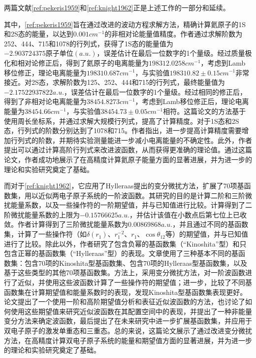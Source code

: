 两篇文献\cref{ref:pekeris1959}和\cref{ref:knight1962}正是上述工作的一部分和延续。

其中，\cref{ref:pekeris1959}旨在通过改进的波动方程求解方法，精确计算氦原子的1S和2S态的能量，以达到$0.001 cm^{-1}$的非相对论能量值精度。作者通过求解阶数为252、444、715和1078的行列式，获得了1S态的能量值为$-2.903724375\text{原子单位}(a.u.)$，误差估计在最后一位数字的1个量级。经过质量极化和相对论修正后，得到了氦原子的电离能量为$198312.0258 cm^{-1}$，考虑到Lamb移位修正，理论电离能量为$198310.687 cm^{-1}$，与实验值$198310.82\pm0.15 cm^{-1}$非常接近。对2S态，求解阶数为125、252、444和715的行列式，最终能量值为$-2.17522937822 a.u.$，误差估计在最后一位数字的1个量级。经过相同的修正后，得到了非相对论电离能量为$38454.8273 cm^{-1}$，考虑到Lamb移位修正后，理论电离能量为$38454.66 cm^{-1}$，与实验值$38454.73\pm0.05 cm^{-1}$相符。这篇论文的方法基于使用周长坐标系，并通过求解大规模行列式，提高了计算精度。对于1S态和2S态，行列式的阶数分别达到了1078和715。作者指出，进一步提高计算精度需要增加行列式的阶数，并期待实验测量能进一步减小电离能量的不确定性。此外，作者提出可以通过计算高阶行列式来改进波函数，从而获得更准确的理论值。通过这篇论文，作者成功地展示了在高精度计算氦原子能量方面的显著进展，并为进一步的理论和实验研究奠定了基础。

而对于\cref{ref:knight1962}，它应用了Hylleraas提出的变分微扰方法，扩展了70项基函数集，用以近似两电子原子系统的一阶波函数。其研究的目的是计算二阶和三阶微扰能量系数，以及一些操作符的一阶期望值，并与已知值进行比较。计算得到了二阶微扰能量系数的上限为$-0.15766625 a.u.$，并估计该值在小数点后第七位上已收敛。作者计算得到了三阶微扰能量系数为$0.00869868 a.u.$，并且通过不同的基函数集，计算了一些操作符（如\(\delta(r_1)\)、\(r_1^{-2}\)、\(r_1\)、\(\cos\theta_{12}\)等）的期望值，并与已知值进行了比较。除此以外，作者研究了包含负幂的基函数集（“Kinoshita”型）和只包含正幂的基函数集（“Hylleraas”型）的表现。文章使用了三种基本不同的基函数集：包含70项的Kinoshita型基函数集、包含70项的Hylleraas型基函数集，以及基于这些类型的其他70项基函数集。方法上，采用变分微扰方法，对一阶波函数进行了近似，并使用这些波函数计算了一些操作符的期望值；进一步，比较了不同基函数集在计算期望值和能量系数时的表现，发现Kinoshita型基函数集表现更好。论文提出了一个使用一阶和高阶期望值分析和表征近似波函数的方法，也讨论了如何使用这些期望值来研究近似波函数在其配置空间中的表现，并提出了一种非能量变分方法来确定波函数，最后提出了在未来研究中进一步扩展基函数集，并应用于双电子原子的激发单重态和三重态。总的来说，这篇论文展示了通过改进变分微扰方法，在高精度计算双电子原子系统的能量和期望值方面的显著进展，并为进一步的理论和实验研究奠定了基础。

